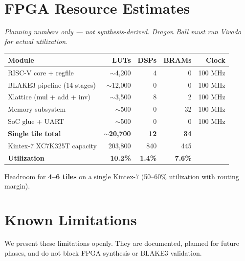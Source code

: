 \documentclass[11pt,a4paper]{article}
\begin{document}
\section{FPGA Resource Estimates}

\textit{Planning numbers only --- not synthesis-derived. Dragon Ball must run Vivado for actual utilization.}

\begin{center}
\begin{tabular}{@{}lrrrr@{}}
\toprule
\textbf{Module} & \textbf{LUTs} & \textbf{DSPs} & \textbf{BRAMs} & \textbf{Clock} \\
\midrule
RISC-V core + regfile & $\sim$4,200 & 4 & 0 & 100 MHz \\
BLAKE3 pipeline (14 stages) & $\sim$12,000 & 0 & 0 & 100 MHz \\
Xlattice (mul + add + inv) & $\sim$3,500 & 8 & 2 & 100 MHz \\
Memory subsystem & $\sim$500 & 0 & 32 & 100 MHz \\
SoC glue + UART & $\sim$500 & 0 & 0 & 100 MHz \\
\midrule
\textbf{Single tile total} & \textbf{$\sim$20,700} & \textbf{12} & \textbf{34} & \\
\midrule
Kintex-7 XC7K325T capacity & 203,800 & 840 & 445 & \\
\textbf{Utilization} & \textbf{10.2\%} & \textbf{1.4\%} & \textbf{7.6\%} & \\
\bottomrule
\end{tabular}
\end{center}

Headroom for \textbf{4--6 tiles} on a single Kintex-7 (50--60\% utilization with routing margin).

\section{Known Limitations}

\begin{amberbox}
We present these limitations openly. They are documented, planned for future phases, and do not block FPGA synthesis or BLAKE3 validation.
\end{amberbox}
\end{document}
